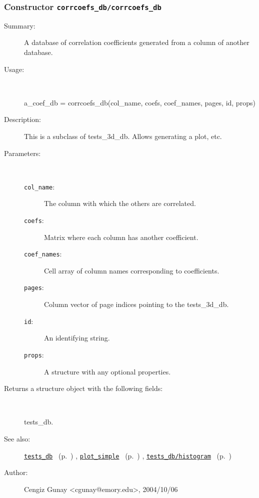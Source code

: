 \subsubsection[Constructor \texttt{corrcoefs\_db}]{Constructor \texttt{corrcoefs\_db/corrcoefs\_db}}%
%
\label{ref_corrcoefs_db__corrcoefs_db}%
\hypertarget{ref_corrcoefs_db__corrcoefs_db}{}%
\begin{description}
\item[Summary:]A database of correlation coefficients generated from 
		a column of another database.
%
\item[Usage:]~%
\begin{lyxcode}%
a\_coef\_db = corrcoefs\_db(col\_name, coefs, coef\_names, pages, id, props)
%
\end{lyxcode}%
%
\item[Description:]%
This is a subclass of tests\_3d\_db. Allows generating a plot, etc.
\item[Parameters:]~
\begin{description}%
\item[\texttt{col\_name}:]
 The column with which the others are correlated.
\item[\texttt{coefs}:]
 Matrix where each column has another coefficient.
\item[\texttt{coef\_names}:]
 Cell array of column names corresponding to coefficients.
\item[\texttt{pages}:]
 Column vector of page indices pointing to the tests\_3d\_db.
\item[\texttt{id}:]
 An identifying string.
\item[\texttt{props}:]
 A structure with any optional properties.
\end{description}%
%
\item[Returns a structure object with the following fields:
]~

	tests\_db.
%
%
\item[See also:]%
\hyperlink{ref_tests_db}{\texttt{tests\_db}}%
\ (p.~\pageref{ref_tests_db})%
%
, \hyperlink{ref_plot_simple}{\texttt{plot\_simple}}%
\ (p.~\pageref{ref_plot_simple})%
%
, \hyperlink{ref_tests_db__histogram}{\texttt{tests\_db/histogram}}%
\ (p.~\pageref{ref_tests_db__histogram})%
%
%
\item[Author:]%
Cengiz Gunay <cgunay@emory.edu>, 2004/10/06
%
\end{description}
\methodline%
